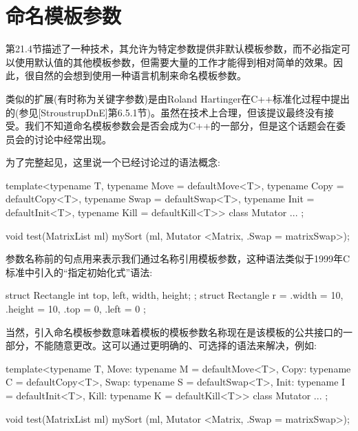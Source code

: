 \section{命名模板参数}
第21.4节描述了一种技术，其允许为特定参数提供非默认模板参数，而不必指定可以使用默认值的其他模板参数，但需要大量的工作才能得到相对简单的效果。因此，很自然的会想到使用一种语言机制来命名模板参数。

类似的扩展(有时称为关键字参数)是由Roland Hartinger在C++标准化过程中提出的(参见[StroustrupDnE]第6.5.1节)。虽然在技术上合理，但该提议最终没有接受。我们不知道命名模板参数会是否会成为C++的一部分，但是这个话题会在委员会的讨论中经常出现。

为了完整起见，这里说一个已经讨论过的语法概念:

\begin{cpp}
template<typename T,
	typename Move = defaultMove<T>,
	typename Copy = defaultCopy<T>,
	typename Swap = defaultSwap<T>,
	typename Init = defaultInit<T>,
	typename Kill = defaultKill<T>>
class Mutator {
	...
};

void test(MatrixList ml)
{
	mySort (ml, Mutator <Matrix, .Swap = matrixSwap>);
}
\end{cpp}

参数名称前的句点用来表示我们通过名称引用模板参数，这种语法类似于1999年C标准中引入的“指定初始化式”语法:

\begin{cpp}
struct Rectangle { int top, left, width, height; };
struct Rectangle r = { .width = 10, .height = 10, .top = 0, .left = 0 };
\end{cpp}

当然，引入命名模板参数意味着模板的模板参数名称现在是该模板的公共接口的一部分，不能随意更改。这可以通过更明确的、可选择的语法来解决，例如:

\begin{cpp}
template<typename T,
	Move: typename M = defaultMove<T>,
	Copy: typename C = defaultCopy<T>,
	Swap: typename S = defaultSwap<T>,
	Init: typename I = defaultInit<T>,
	Kill: typename K = defaultKill<T>>
class Mutator {
	...
};

void test(MatrixList ml)
{
	mySort (ml, Mutator <Matrix, .Swap = matrixSwap>);
}
\end{cpp}









































